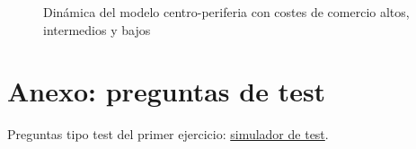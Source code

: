 \documentclass[11pt]{article}
\begin{document}
\begin{figure}[H]
\centering
\caption{Dinámica del modelo centro-periferia con costes de comercio altos, intermedios y bajos}\label{fig:centro-periferia-dinamica}
\end{figure}

\section{Anexo: preguntas de test}\label{anexo:test}

\begin{anotaciones}
Preguntas tipo test del primer ejercicio: \href{https://www.victorgutierrezmarcos.es/oposicion/temario/primer-ejercicio/test/simulador.html?tema=3.B.10}{simulador de test}.
\end{anotaciones}

\bibliografia
\end{document}
